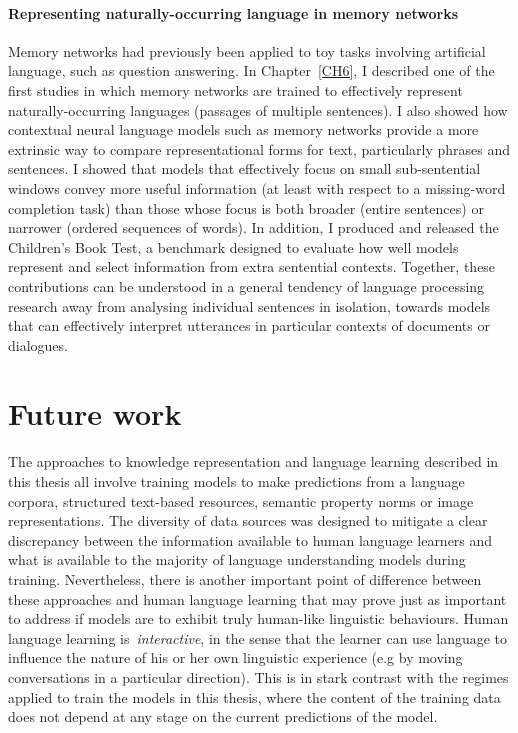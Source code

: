 \paragraph{Representing naturally-occurring language in memory networks} Memory networks had previously been applied to toy tasks involving artificial language, such as question answering. In Chapter~\ref{CH6}, I described one of the first studies in which memory networks are trained to effectively represent naturally-occurring languages (passages of multiple sentences). I also showed how contextual neural language models such as memory networks provide a more extrinsic way to compare representational forms for text, particularly phrases and sentences. I showed that models that effectively focus on small sub-sentential windows convey more useful information (at least with respect to a missing-word completion task) than those whose focus is both broader (entire sentences) or narrower (ordered sequences of words). In addition, I produced and released the Children's Book Test, a benchmark designed to evaluate how well models represent and select information from extra sentential contexts. Together, these contributions can be understood in a general tendency of language processing research away from analysing individual sentences in isolation, towards models that can effectively interpret utterances in particular contexts of documents or dialogues.  

\section{Future work} The approaches to knowledge representation and language learning described in this thesis all involve training models to make predictions from a language corpora, structured text-based resources, semantic property norms or image representations. The diversity of data sources was designed to mitigate a clear discrepancy between the information available to human language learners and what is available to the majority of language understanding models during training. Nevertheless, there is another important point of difference between these approaches and human language learning that may prove just as important to address if models are to exhibit truly human-like linguistic behaviours. Human language learning is~\emph{interactive}, in the sense that the learner can use language to influence the nature of his or her own linguistic experience (e.g by moving conversations in a particular direction). This is in stark contrast with the regimes applied to train the models in this thesis, where the content of the training data does not depend at any stage on the current predictions of the model. 

